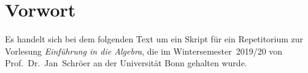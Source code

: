\chapter*{Vorwort}

Es handelt sich bei dem folgenden Text um ein Skript für ein Repetitorium zur Vorlesung \emph{Einführung in die Algebra}, die im Wintersemester~2019/20 von Prof.~Dr.~Jan~Schröer an der Universität Bonn gehalten wurde.

